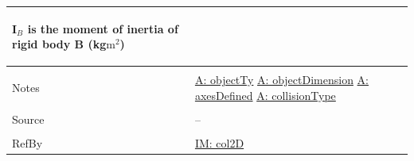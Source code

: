\documentclass[12pt]{article}
\begin{document}
\begin{minipage}{\textwidth}
\begin{tabular}{p{} p{}}
\begin{symbDescription}
              \item{${\mathbf{I}_{B}}$ is the moment of inertia of rigid body B (kg$\text{m}^{2}$)}
              \end{symbDescription}
\\ \midrule \\
Notes & \hyperref[assumpOT]{A: objectTy}
        \hyperref[assumpOD]{A: objectDimension}
        \hyperref[assumpAD]{A: axesDefined}
        \hyperref[assumpCT]{A: collisionType}
\\ \midrule \\
Source & --
\\ \midrule \\
RefBy & \hyperref[IM:col2D]{IM: col2D}
\\ \bottomrule \end{tabular}
\end{minipage}
\par~
\end{document}
